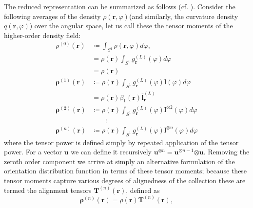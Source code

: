 The reduced representation can be summarized as follows (cf. \cite{Hochrainer2015,Monavari2016}). Consider the following averages of the density \(\rho\left( \boldsymbol{r},\varphi \right)\)(and similarly, the
curvature density \(q\left( \boldsymbol{r},\varphi \right)\)) over the
angular space, let us call these the tensor moments of the higher-order density field:
\begin{subequations}
\begin{align}
    \rho^{(0)}\left( \boldsymbol{r} \right)&\coloneqq\int_{S^{1}}^{}{\rho\left( \boldsymbol{r},\varphi \right)d\varphi},\\
    &= \rho\left( \boldsymbol{r} \right)\int_{S^{1}}^{}{g_{\boldsymbol{r}}^{(L)}(\varphi)d\varphi}\\
    &= \rho\left( \boldsymbol{r} \right)\\
    \boldsymbol{\rho}^{(1)}\left( \boldsymbol{r} \right) &\coloneqq \rho\left( \boldsymbol{r} \right)\int_{S^{1}}^{}{g_{\boldsymbol{r}}^{(L)}(\varphi)\boldsymbol{l}(\varphi)d\varphi}\\
    &= \rho\left( \boldsymbol{r} \right)\beta_{1}\left( \boldsymbol{r} \right){\overline{\boldsymbol{l}}}_{\boldsymbol{r}}^{\left(L \right)}\label{eq:1circavAltens}\\
    \boldsymbol{\rho}^{\left( \boldsymbol{2} \right)}\left( \boldsymbol{r} \right)&\coloneqq\rho\left( \boldsymbol{r} \right)\int_{S^{1}}^{}{g_{\boldsymbol{r}}^{(L)}(\varphi)\boldsymbol{l}^{\otimes 2}(\varphi)d\varphi}\\
    &\qquad\vdots\nonumber\\
    \boldsymbol{\rho}^{(n)}\left( \boldsymbol{r} \right)&\coloneqq\rho\left( \boldsymbol{r} \right)\int_{S^{1}}^{}{g_{\boldsymbol{r}}^{(L)}(\varphi)\boldsymbol{l}^{\otimes n}(\varphi)d\varphi}
\end{align}
\end{subequations}
where the tensor power is defined simply by repeated application of the
tensor power. For a vector \(\boldsymbol{u}\) we can define it recursively
\(\boldsymbol{u}^{\otimes n}=\boldsymbol{u}^{\otimes n - 1}\boldsymbol{\otimes u}\). Removing the zeroth order component we arrive at simply an alternative formulation of the orientation distribution function in terms of these tensor moments; because these tensor moments capture various degrees of alignedness of the collection these are termed the alignment tensors $\mathbf{T}^{(n)}(\boldsymbol{r})$, defined as 
\begin{equation}
\boldsymbol{\rho}^{(n)}\left( \boldsymbol{r} \right)=\rho\left( \boldsymbol{r} \right)\mathbf{T}^{(n)}\left( \boldsymbol{r} \right),
\end{equation}
